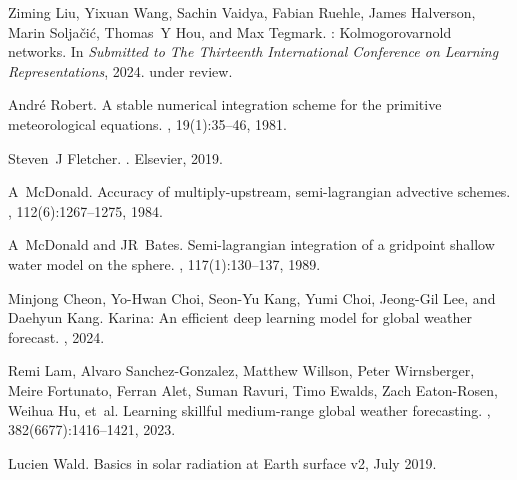 \documentclass[preprint]{article}
\begin{document}
\begin{thebibliography}{9}

Ziming Liu, Yixuan Wang, Sachin Vaidya, Fabian Ruehle, James Halverson, Marin Solja{\v{c}}i{\'c}, Thomas~Y Hou, and Max Tegmark.
: Kolmogorov{\textendash}arnold networks.
\newblock In {\em Submitted to The Thirteenth International Conference on Learning Representations}, 2024.
\newblock under review.

Andr{\'e} Robert.
\newblock A stable numerical integration scheme for the primitive meteorological equations.
, 19(1):35--46, 1981.

Steven~J Fletcher.
.
\newblock Elsevier, 2019.

A~McDonald.
\newblock Accuracy of multiply-upstream, semi-lagrangian advective schemes.
, 112(6):1267--1275, 1984.

A~McDonald and JR~Bates.
\newblock Semi-lagrangian integration of a gridpoint shallow water model on the sphere.
, 117(1):130--137, 1989.

Minjong Cheon, Yo-Hwan Choi, Seon-Yu Kang, Yumi Choi, Jeong-Gil Lee, and Daehyun Kang.
\newblock Karina: An efficient deep learning model for global weather forecast.
, 2024.

Remi Lam, Alvaro Sanchez-Gonzalez, Matthew Willson, Peter Wirnsberger, Meire Fortunato, Ferran Alet, Suman Ravuri, Timo Ewalds, Zach Eaton-Rosen, Weihua Hu, et~al.
\newblock Learning skillful medium-range global weather forecasting.
, 382(6677):1416--1421, 2023.

Lucien Wald.
\newblock Basics in solar radiation at {Earth} surface v2, July 2019.

\end{thebibliography}
\end{document}
